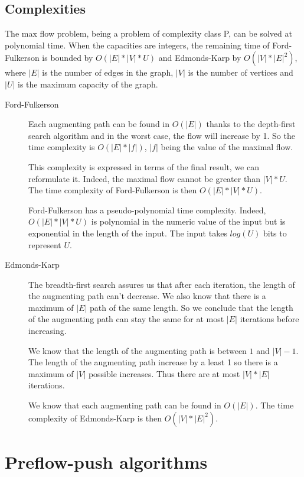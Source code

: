 \subsection{Complexities}
The max flow problem, being a problem of complexity class P, can be solved at polynomial time. When the capacities are integers, the remaining time of Ford-Fulkerson is bounded by $O(|E|*|V|*U)$ and Edmonds-Karp by $O(|V|*|E|^2)$, where $|E|$ is the number of edges in the graph, $|V|$ is the number of vertices and $|U|$ is the maximum capacity of the graph.

\begin{description}
\item[Ford-Fulkerson]{Each augmenting path can be found in $O(|E|)$ thanks to the depth-first search algorithm and in the worst case, the flow will increase by 1. So the time complexity is $O(|E|*|f|)$, $|f|$ being the value of the maximal flow. 

This complexity is expressed in terms of the final result, we can reformulate it. Indeed, the maximal flow cannot be greater than $|V|*U$. The time complexity of Ford-Fulkerson is then $O(|E|*|V|*U)$.

Ford-Fulkerson has a pseudo-polynomial time complexity. Indeed, $O(|E|*|V|*U)$ is polynomial in the numeric value of the input but is exponential in the length of the input. The input takes $log(U)$ bits to represent $U$.}

\item[Edmonds-Karp]{The breadth-first search assures us that after each iteration, the length of the augmenting path can't decrease. We also know that there is a maximum of $|E|$ path of the same length. So we conclude that the length of the augmenting path can stay the same for at most $|E|$ iterations before increasing. 

We know that the length of the augmenting path is between $1$ and $|V|-1$. The length of the augmenting path increase by a least 1 so there is a maximum of $|V|$ possible increases. Thus there are at most $|V|*|E|$ iterations.

We know that each augmenting path can be found in $O(|E|)$. The time complexity of Edmonds-Karp is then $O(|V|*|E|^2)$.}
\end{description}



\section{Preflow-push algorithms}

